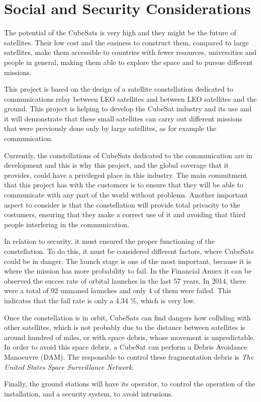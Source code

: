 \chapter{Social and Security Considerations}
The potential of the CubeSats is very high and they might be the future of satellites. Their low cost and the easiness to construct them, compared to large satellites, make them accessible to countries with fewer resources, universities and people in general, making them able to explore the space and to pursue different missions.

This project is based on the design of a satellite constellation dedicated to communications relay between LEO satellites and between LEO satellites and the ground. This project is helping to develop the CubeSat industry and its use and it will demonstrate that these small satellites can carry out different missions that were previously done only by large satellites, as for example the communication.

Currently, the constellations of CubeSats dedicated to the communication are in development and this is why this project, and the global coverage that it provides, could have a privileged place in this industry. The main commitment that this project has with the customers is to ensure that they will be able to communicate with any part of the world without problems. Another important aspect to consider is that the constellation will provide total privacity  to the costumers, ensuring that they make a correct use of it and avoiding that third people interfering in the communication. 

In relation to security, it must ensured the proper functioning of the constellation. To do this, it must be considered different factors, where CubeSats could be in danger. The launch stage is one of the most important, because it is where the mission has more probability to fail. In the Financial Annex it can be observed the succes rate of orbital launches in the last 57 years. In 2014, there were a total of 92 unmaned launches and only 4 of them were failed. This indicates that the fail rate is only a 4,34 \%, which is very low. 

Once the constellation is in orbit, CubeSats can find dangers how colliding with other satellites, which is not probably due to the distance between satellites is around hundred of miles, or with space debris, whose movement is unpredictable. In order to avoid this space debris, a CubeSat can perform a Debris Avoidance Manoeuvre (DAM). The responsible to control these fragmentation debris is \textit{The United States Space Surveillance Network}.

Finally, the ground stations will have its operator, to control the operation of the installation, and a security system, to avoid intrusions.
